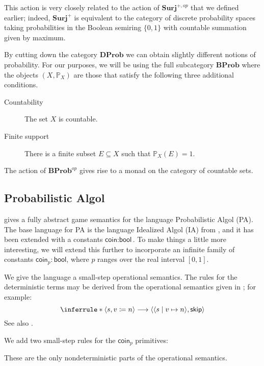 \documentclass{svproc}
\newcommand*\from{\colon}
\newcommand{\opto}{\longrightarrow}
\newcommand{\0}{{\mathtt{0}}} \newcommand{\com}{{\mathtt{com}}}
\newcommand{\skipp}{{\mathsf{skip}}}
\newcommand{\ia}[2]{\langle #1 , #2 \rangle}
\newcommand{\stup}[3]{\langle #1 \mid #2 \mapsto #3 \rangle}
\newcommand{\catname}[1]{\mathbf{#1}}
\newcommand{\Surj}{\catname{Surj}}
\newcommand{\DProb}{\catname{DProb}}
\newcommand{\BProb}{\catname{BProb}}
\newcommand{\true}{\mathbbm{t}}
\newcommand{\false}{\mathbbm{f}}
\newcommand{\bP}{\mathbb{P}}
\newcommand{\coin}{\textsf{coin}}
\newcommand{\bool}{\textsf{bool}}
\begin{document}
This action is very closely related to the action of $\Surj^{+,op}$ that we defined earlier; indeed, $\Surj^+$ is equivalent to the category of discrete probability spaces taking probabilities in the Boolean semiring $\{0,1\}$ with countable summation given by maximum.

By cutting down the category $\DProb$ we can obtain slightly different notions of probability.  
For our purposes, we will be using the full subcategory $\BProb$ where the objects $(X,\bP_X)$ are those that satisfy the following three additional conditions.
\begin{description}
  \item[Countability] The set $X$ is countable.
  \item[Finite support] There is a finite subset $E\subseteq X$ such that $\bP_X(E)=1$.
\end{description}

The action of $\BProb^{op}$ gives rise to a monad on the category of countable sets.  

\subsection{Probabilistic Algol}

\cite{DanosHarmer} gives a fully abstract game semantics for the language Probabilistic Algol (PA).  
The base language for PA is the language Idealized Algol (IA) from \cite{SamsonGuyIAPassive}, and it has been extended with a constants $\coin\from\bool$.  
To make things a little more interesting, we will extend this further to incorporate an infinite family of constants $\coin_p\from\bool$, where $p$ ranges over the real interval $[0,1]$.  

We give the language a small-step operational semantics.  
The rules for the deterministic terms may be derived from the operational semantics given in \cite{SamsonGuyIAPassive}; for example:
\[
  \inferrule*{ }{\ia s {v \coloneqq n} \opto \ia {\stup s v n} \skipp}
  \]
See also \cite{JimGuySmallStep}.

We add two small-step rules for the $\coin_p$ primitives:


These are the only nondeterministic parts of the operational semantics.  
\end{document}
